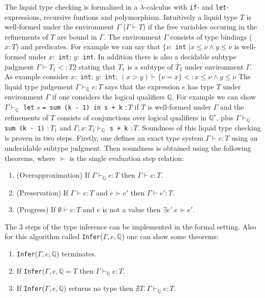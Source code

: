 \documentclass[a4paper,UKenglish]{lipics-v2016}
\begin{document}
The liquid type checking is formalized in a $\lambda$-calculus with \lstinline{if}- and \lstinline{let}-expressions, recursive funtions and polymorphism.
Intuitively a liquid type $T$ is well-formed under the environment $\Gamma$ ($\Gamma \vdash T$) if the free variables occuring in the refinements of $T$ are bound in $\Gamma$.
The environment $\Gamma$ consists of type bindings ($x: T$) and predicates.
For example we can say that $\{\nu:$ \lstinline{int} $\mid x \le \nu \land y \le \nu$ is well-formed under $x:$ \lstinline{int}; $y:$ \lstinline{int}.
In addition there is also a decidable subtype judgment $\Gamma \vdash T_1 <: T2$ stating that $T_1$ is a subtype of $T_2$ under environment $\Gamma$.
As example consider $x:$ \lstinline{int}; $y:$ \lstinline{int}; $(x > y) \vdash \{\nu = x \} <: x \le \nu \land y \le \nu$
The liquid type judgement $\Gamma \vdash_{\mathbb{Q}} e: T$ says that the expression $e$ has type $T$ under environment $\Gamma$ if one considers the logical qualifiers $\mathbb{Q}$.
For example we can show $\Gamma \vdash_{\mathbb{Q}}$ \lstinline{let} $s$ \lstinline{= sum (k - 1) in s + k} $: T$ if $T$ is well-formed under $\Gamma$ and the refinements of $T$ consists of conjunctions over logical qualifiers in $\mathbb{Q}^\star$, plus
$\Gamma \vdash_{\mathbb{Q}}$ \lstinline{sum (k - 1)} $:T_1$ and $\Gamma; x: T_1 \vdash_{\mathbb{Q}}$ \lstinline{s + k} $: T$.
Soundness of this liquid type checking is proven in two steps.
Firstly, one defines an exact type system $\Gamma \vdash e: T$ using an undecidable subtype judgment.
Then soundness is obtained using the following theorems, where $\succ$ is the single evaluation step relation:
\begin{enumerate}
    \label{thm:sound}
    \item (Overapproximation) If $\Gamma \vdash_{\mathbb{Q}} e: T$ then $\Gamma \vdash e: T$.
    \item (Preservation) If $\Gamma \vdash e: T$ and $e \succ e'$ then $\Gamma \vdash e': T$.
    \item (Progress) If $\emptyset \vdash e: T$ and $e$ is not a value then $\exists e'. e \succ e'$.
\end{enumerate}

The 3 steps of the type inference can be implemented in the formal setting.
Also for this algorithm called \lstinline{Infer}($\Gamma, e, \mathbb{Q}$) one can show some theorems:
\begin{enumerate}
    \item \lstinline{Infer}($\Gamma, e, \mathbb{Q}$) terminates.
    \item If \lstinline{Infer}$(\Gamma, e, \mathbb{Q} = T$ then $\Gamma \vdash_{\mathbb{Q}} e: T$.
    \item If \lstinline{Infer}($\Gamma, e, \mathbb{Q}$) returns no type then $\nexists T.\, \Gamma \vdash_{\mathbb{Q}} e: T$.
\end{enumerate}
\end{document}
